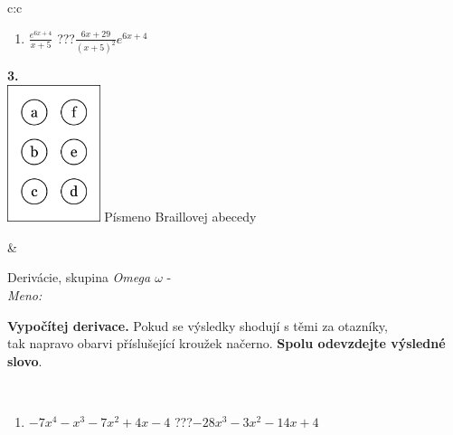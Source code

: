 \documentclass[10pt]{report}
\begin{document}
\begin{tabular}{c:c}
\begin{minipage}[c][104.5mm][t]{0.5\linewidth}
\begin{center}
\begin{minipage}{0.79\linewidth}
\begin{center}
\begin{varwidth}{\linewidth}
\begin{enumerate}
\item $\frac{e^{6x+4}}{x+5}$\quad \dotfill\; ???\;\dotfill \quad $\frac{6x+29}{(x+5)^2}e^{6x+4}$
\end{enumerate}
\end{varwidth}
\end{center}
\end{minipage}
\begin{minipage}{0.20\linewidth}
\begin{center}
{\Huge\bfseries 3.} \\[2mm]
\includegraphics[height=40mm]{../images/braille.png}
{\small Písmeno Braillovej abecedy}
\end{center}
\end{minipage}
\end{center}
\end{minipage}
&
\begin{minipage}[c][104.5mm][t]{0.5\linewidth}
\begin{center}
\vspace{7mm}
{\huge Derivácie, skupina \textit{Omega $\omega$} -}\\[5mm]
\textit{Meno:}\phantom{xxxxxxxxxxxxxxxxxxxxxxxxxxxxxxxxxxxxxxxxxxxxxxxxxxxxxxxxxxxxxxxxx}\\[5mm]
\begin{minipage}{0.95\linewidth}
\begin{center}
\textbf{Vypočítej derivace.} Pokud se výsledky shodují s těmi za otazníky,\\tak napravo obarvi příslušející kroužek načerno. \textbf{Spolu odevzdejte výsledné slovo}.
\end{center}
\end{minipage}
\\[1mm]
\begin{minipage}{0.79\linewidth}
\begin{center}
\begin{varwidth}{\linewidth}
\begin{enumerate}
\normalsize
\item $-7x^4-x^3-7x^2+4x-4$\quad \dotfill\; ???\;\dotfill \quad $-28x^3-3x^2-14x+4$

\end{enumerate}
\end{varwidth}
\end{center}
\end{minipage}
\end{center}
\end{minipage}
\end{tabular}
\end{document}
